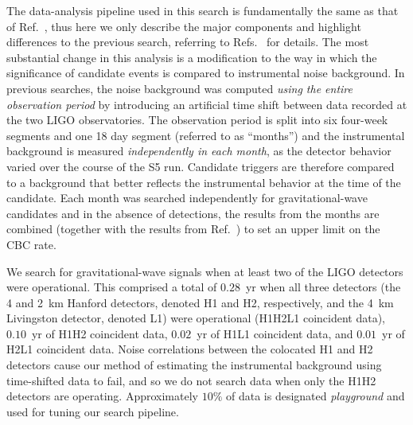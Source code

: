 The data-analysis pipeline used in this search is fundamentally the same as
that of Ref.~\cite{Collaboration:2009tt}, thus here we only describe the major 
components and highlight differences to the previous search, referring to 
Refs.~\cite{LIGOS3S4all,Collaboration:2009tt} for details. The most substantial
change in this analysis is a modification to the way in which the significance
of candidate events is compared to instrumental noise background. In previous
searches, the noise background was computed \emph{using the entire observation
period} by introducing an artificial time shift between data recorded at the
two LIGO observatories. The observation period is split into six four-week 
segments and one 18 day segment (referred to as ``months'') and the 
instrumental background is measured \emph{independently in each month}, as the
detector behavior varied over the course of the S5 run. Candidate triggers are
therefore compared to a background that better reflects the instrumental 
behavior at the time of the candidate.  Each month was searched independently 
for gravitational-wave candidates and in the absence of detections, the results
from the months are combined (together with the results from
Ref.~\cite{Collaboration:2009tt}) to set an upper limit on the CBC rate.

We search for gravitational-wave signals when at least two of the \ac{LIGO}
detectors were operational.  This comprised a total of $0.28$~yr when all three
detectors (the 4 and 2~km Hanford detectors, denoted H1 and H2, respectively, 
and the 4~km Livingston detector, denoted L1) were operational 
(H1H2L1 coincident data), $0.10$~yr of H1H2 coincident data, $0.02$~yr of H1L1 
coincident data, and $0.01$~yr of H2L1 coincident data.  Noise correlations 
between the colocated H1 and H2 detectors cause our method of estimating the 
instrumental background using time-shifted data to fail, and so we do not 
search data when only the H1H2 detectors are operating. Approximately $10\%$ of
data is designated \textit{playground} and used for tuning our search pipeline.

